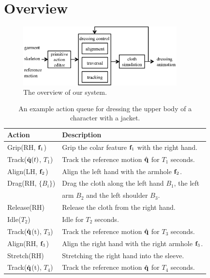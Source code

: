 \section{Overview}


\begin{figure}
  \centering
  \includegraphics[width=3.3in]{images/overview}
  \caption{The overview of our system.}
  \label{fig:overview}
\end{figure}

\begin{table}
  \centering
  \begin{tabular}{|l|l|}
    \hline
    Action & Description \\
    \hline
    Grip(RH, $\mathbf{f}_{1}$) & Grip the colar feature $\mathbf{f}_1$  with the right hand.\\
    Track($\hat{\mathbf{q}}(t)$, $T_1$) & Track the reference motion $\hat{\mathbf{q}}$ for $T_1$ seconds.\\
    Align(LH, $\mathbf{f}_{2}$) & Align the left hand with the armhole $\mathbf{f}_2$.\\
    Drag(RH, $\{B_i\}$) & Drag the cloth along the left hand $B_1$, the left\\
    &                      arm $B_2$ and the left shoulder $B_3$.\\
    Release(RH) & Release the cloth from the right hand.\\
    Idle($T_2$) & Idle for $T_2$ seconds.\\
    Track($\hat{\mathbf{q}}$(t), $T_3$) & Track the reference motion $\hat{\mathbf{q}}$ for $T_3$ seconds.\\
    Align(RH, $\mathbf{f}_{3}$) & Align the right hand with the right armhole $\mathbf{f}_3$.\\
    Stretch(RH) & Stretching the right hand into the sleeve.\\
    Track($\hat{\mathbf{q}}$(t), $T_4$) & Track the reference motion $\hat{\mathbf{q}}$ for $T_4$ seconds. \\
    \hline
  \end{tabular}
  \caption{An example action queue for dressing the upper body of a character with a jacket.}
  \label{table:actionQueue}
\end{table}


